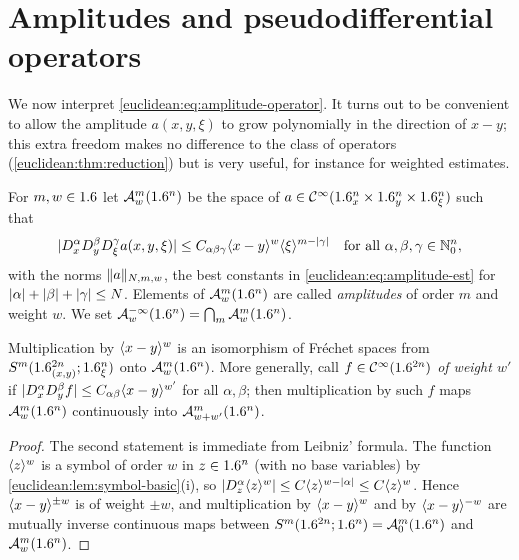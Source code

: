\section{Amplitudes and pseudodifferential operators}\label{euclidean:sec:operators}

We now interpret \eqref{euclidean:eq:amplitude-operator}. It turns out to be
convenient to allow the amplitude $a(x,y,\xi)$ to grow polynomially in the
direction of $x-y$; this extra freedom makes no difference to the class of
operators (\cref{euclidean:thm:reduction}) but is very useful, for instance
for weighted estimates.

\begin{definition}\label{euclidean:def:amplitude}
  For $m,w\in1.6$ let $\mathcal{A}^{m}_{w}(1.6^n)$ be the space of
  $a\in\mathcal{C}^\infty(1.6^n_x\times1.6^n_y\times1.6^n_\xi)$ such that
  \begin{equation}\label{euclidean:eq:amplitude-est}
    \lvert D^\alpha_xD^\beta_yD^\gamma_\xi a(x,y,\xi)\rvert\le
    C_{\alpha\beta\gamma}\langle x-y\rangle^w\langle \xi\rangle^{m-\lvert \gamma\rvert}
    \quad\text{for all }\alpha,\beta,\gamma\in\mathbb{N}_0^n,
  \end{equation}
  with the norms $\lVert a\rVert_{N,m,w}$, the best constants in
  \eqref{euclidean:eq:amplitude-est} for $\lvert \alpha\rvert+\lvert \beta\rvert+\lvert \gamma\rvert\le N$.
  Elements of $\mathcal{A}^{m}_{w}(1.6^n)$ are called \emph{amplitudes} of order $m$ and
  weight $w$. We set $\mathcal{A}^{-\infty}_{w}(1.6^n)=\bigcap_m\mathcal{A}^{m}_{w}(1.6^n)$.
\end{definition}

\begin{lemma}\label{euclidean:lem:amplitude-char}
  Multiplication by $\langle x-y\rangle^w$ is an isomorphism of Fr\'echet spaces
  from $S^m(1.6^{2n}_{(x,y)};1.6^n_\xi)$ onto $\mathcal{A}^{m}_{w}(1.6^n)$. More generally, call
  $f\in\mathcal{C}^\infty(1.6^{2n})$ \emph{of weight $w'$} if
  $\lvert D^\alpha_xD^\beta_yf\rvert\le C_{\alpha\beta}\langle x-y\rangle^{w'}$ for all
  $\alpha,\beta$; then multiplication by such $f$ maps $\mathcal{A}^{m}_{w}(1.6^n)$
  continuously into $\mathcal{A}^{m}_{w+w'}(1.6^n)$.
\end{lemma}
\begin{proof}
  The second statement is immediate from Leibniz' formula. The function
  $\langle z\rangle^w$ is a symbol of order $w$ in $z\in1.6^n$ (with no base variables)
  by \cref{euclidean:lem:symbol-basic}(i), so
  $\lvert D^\alpha_z\langle z\rangle^{w}\rvert\le C\langle z\rangle^{w-\lvert \alpha\rvert}\le C\langle z\rangle^w$. Hence
  $\langle x-y\rangle^{\pm w}$ is of weight $\pm w$, and multiplication by
  $\langle x-y\rangle^{w}$ and by $\langle x-y\rangle^{-w}$ are mutually inverse continuous
  maps between $S^m(1.6^{2n};1.6^n)=\mathcal{A}^{m}_{0}(1.6^n)$ and $\mathcal{A}^{m}_{w}(1.6^n)$.
\end{proof}

